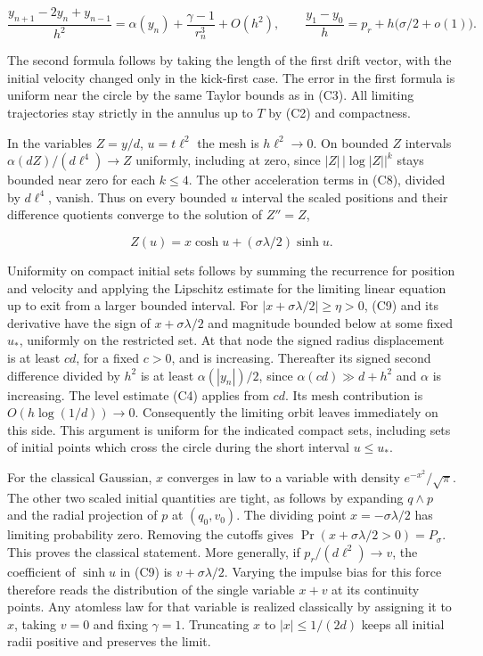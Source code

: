 \documentclass[11pt,a4paper]{article}
\begin{document}
\[
 \frac{y_{n+1}-2y_n+y_{n-1}}{h^2}
   =\alpha(y_n)+\frac{\gamma-1}{r_n^3}+O(h^2),\qquad
 \frac{y_1-y_0}{h}=p_r+h\bigl(\sigma/2+o(1)\bigr).
 \tag{C8}
\]

The second formula follows by taking the length of the first drift
vector, with the initial velocity changed only in the kick-first case.
The error in the first formula is uniform near the circle by the same
Taylor bounds as in (C3). All limiting trajectories stay strictly in the
annulus up to \(T\) by (C2) and compactness.

In the variables \(Z=y/d\), \(u=t\ell^2\) the mesh is \(h\ell^2\to0\).
On bounded \(Z\) intervals \(\alpha(dZ)/(d\ell^4)\to Z\) uniformly,
including at zero, since \(|Z|\,|\log |Z||^k\) stays bounded near zero
for each \(k\le4\). The other acceleration terms in (C8), divided by
\(d\ell^4\), vanish. Thus on every bounded \(u\) interval the scaled
positions and their difference quotients converge to the solution of
\(Z''=Z\),

\[
 Z(u)=x\cosh u+(\sigma\lambda/2)\sinh u .                       \tag{C9}
\]

Uniformity on compact initial sets follows by summing the recurrence for
position and velocity and applying the Lipschitz estimate for the
limiting linear equation up to exit from a larger bounded interval. For
\(|x+\sigma\lambda/2|\ge\eta>0\), (C9) and its derivative have the sign
of \(x+\sigma\lambda/2\) and magnitude bounded below at some fixed
\(u_*\), uniformly on the restricted set. At that node the signed radius
displacement is at least \(c d\), for a fixed \(c>0\), and is
increasing. Thereafter its signed second difference divided by \(h^2\)
is at least \(\alpha(|y_n|)/2\), since \(\alpha(cd)\gg d+h^2\) and
\(\alpha\) is increasing. The level estimate (C4) applies from \(cd\).
Its mesh contribution is \(O(h\log(1/d))\to0\). Consequently the
limiting orbit leaves immediately on this side. This argument is uniform
for the indicated compact sets, including sets of initial points which
cross the circle during the short interval \(u\le u_*\).

For the classical Gaussian, \(x\) converges in law to a variable with
density \(e^{-x^2}/\sqrt\pi\). The other two scaled initial quantities
are tight, as follows by expanding \(q\wedge p\) and the radial
projection of \(p\) at \((q_0,v_0)\). The dividing point
\(x=-\sigma\lambda/2\) has limiting probability zero. Removing the
cutoffs gives \(\Pr(x+\sigma\lambda/2>0)=P_\sigma\). This proves the
classical statement. More generally, if \(p_r/(d\ell^2)\to v\), the
coefficient of \(\sinh u\) in (C9) is \(v+\sigma\lambda/2\). Varying the
impulse bias for this force therefore reads the distribution of the
single variable \(x+v\) at its continuity points. Any atomless law for
that variable is realized classically by assigning it to \(x\), taking
\(v=0\) and fixing \(\gamma=1\). Truncating \(x\) to \(|x|\le1/(2d)\)
keeps all initial radii positive and preserves the limit.
\end{document}
